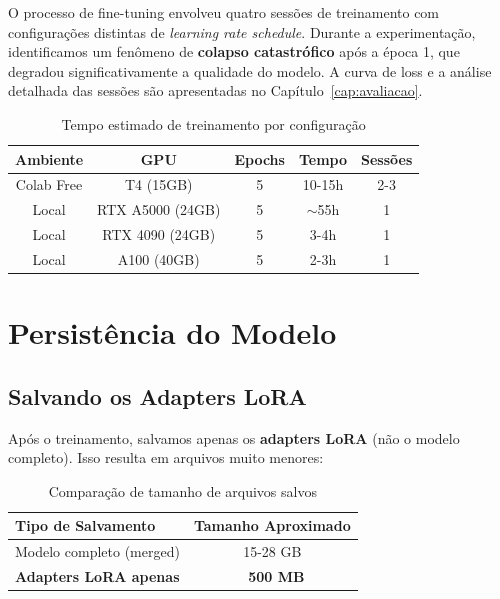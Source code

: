 \begin{warningbox}
O processo de fine-tuning envolveu quatro sessões de treinamento com configurações distintas de \textit{learning rate schedule}. Durante a experimentação, identificamos um fenômeno de \textbf{colapso catastrófico} após a época 1, que degradou significativamente a qualidade do modelo. A curva de loss e a análise detalhada das sessões são apresentadas no Capítulo~\ref{cap:avaliacao}.
\end{warningbox}

\begin{table}[H]
\centering
\caption{Tempo estimado de treinamento por configuração}
\label{tab:tempo-treino}
\begin{tabular}{ccccc}
\toprule
\textbf{Ambiente} & \textbf{GPU} & \textbf{Epochs} & \textbf{Tempo} & \textbf{Sessões} \\
\midrule
Colab Free & T4 (15GB) & 5 & 10-15h & 2-3 \\
Local & RTX A5000 (24GB) & 5 & $\sim$55h & 1 \\
Local & RTX 4090 (24GB) & 5 & 3-4h & 1 \\
Local & A100 (40GB) & 5 & 2-3h & 1 \\
\bottomrule
\end{tabular}
\end{table}

\section{Persistência do Modelo}
\label{sec:persistencia}

\subsection{Salvando os Adapters LoRA}

Após o treinamento, salvamos apenas os \textbf{adapters LoRA} (não o modelo completo). Isso resulta em arquivos muito menores:

\begin{table}[H]
\centering
\caption{Comparação de tamanho de arquivos salvos}
\label{tab:tamanho-modelo}
\begin{tabular}{lc}
\toprule
\textbf{Tipo de Salvamento} & \textbf{Tamanho Aproximado} \\
\midrule
Modelo completo (merged) & 15-28 GB \\
\textbf{Adapters LoRA apenas} & \textbf{~500 MB} \\
\bottomrule
\end{tabular}
\end{table}

